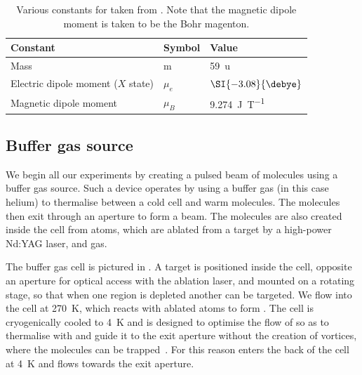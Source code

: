 \begin{table}
  \centering
\begin{tabular}{lll}
  \hline\hline
  Constant & Symbol & Value \\
  \hline
  Mass & m & \SI{59}{\amu}\\
  Electric dipole moment ($X$ state) & $\mu_e$ & $\SI{-3.08}{\debye}$\\
  Magnetic dipole moment & $\mu_B$ & \SI{9.274}{\joule\per\tesla} \\
 \hline
\end{tabular}
\caption{
  Various constants for \CaF{} taken from . Note that
  the magnetic dipole moment is taken to be the Bohr magenton.
  }
  \label{overview:table:constants}
\end{table}

\subsection*{Buffer gas source}

We begin all our experiments by creating a pulsed beam of \CaF{} molecules
using a buffer gas source. Such a device operates by using a buffer gas (in
this case helium) to thermalise between a cold cell and warm molecules. The
molecules then exit through an aperture to form a beam. The \CaF{} molecules
are also created inside the cell from \Ca{} atoms, which are ablated from a
target by a high-power Nd:YAG laser, and \SFsix{} gas.

The buffer gas cell is pictured in . A \Ca{}
target is positioned inside the cell, opposite an aperture for optical access
with the ablation laser, and mounted on a rotating stage, so that when one
region is depleted another can be targeted. We flow \SFsix{} into the cell at
\SI{270}{\kelvin}, which reacts with ablated \Ca{} atoms to form \CaF{}. The
cell is cryogenically cooled to \SI{4}{\kelvin} and is designed to optimise the
flow of \He{} so as to thermalise with \CaF{} and guide it to the exit aperture
without the creation of vortices, where the molecules can be
trapped~\cite{Truppe2018}. For this reason \He{} enters the back of the cell at
\SI{4}{\kelvin} and flows towards the exit aperture.

